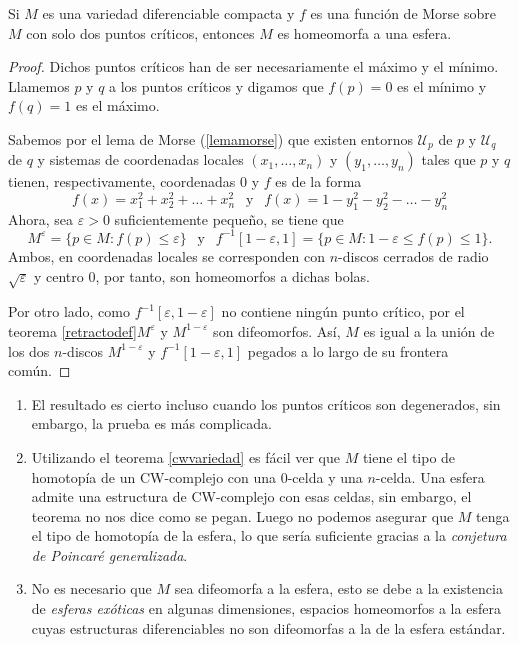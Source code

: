 \begin{theorem}
    Si $M$ es una variedad diferenciable compacta y $f$ es una función de Morse sobre $M$ con solo dos puntos críticos, entonces $M$ es homeomorfa a una esfera.
\end{theorem}
\begin{proof}
    Dichos puntos críticos han de ser necesariamente el máximo y el mínimo. Llamemos $p$ y $q$ a los puntos críticos y digamos que $f(p)=0$ es el mínimo y $f(q)=1$ es el máximo.

    Sabemos por el lema de Morse (\ref{lemamorse}) que existen entornos $\mathcal{U}_p$ de $p$ y $\mathcal{U}_q$ de $q$ y sistemas de coordenadas locales $(x_1,\dots,x_n)$ y $(y_1,\dots,y_n)$ tales que $p$ y $q$ tienen, respectivamente, coordenadas $0$ y $f$ es de la forma
    \begin{equation*}
        f(x) = x_1^2+x_2^2+\dots+x_n^2~~\text{ y }~~ f(x)=1-y_1^2- y_2^2-\dots-y_n^2
    \end{equation*}
    Ahora, sea $\varepsilon > 0$ suficientemente pequeño, se tiene que
    \begin{equation*}
        M^{\varepsilon} = \{p\in M \colon f(p)\le \varepsilon\} ~~\text{ y }~~ f^{-1}[1-\varepsilon,1] = \{p\in M \colon 1-\varepsilon \le f(p)\le 1\}.
    \end{equation*}
    Ambos, en coordenadas locales se corresponden con $n$-discos cerrados de radio $\sqrt{\varepsilon}$ y centro $0$, por tanto, son homeomorfos a dichas bolas.

    Por otro lado, como $f^{-1}[\varepsilon, 1-\varepsilon]$ no contiene ningún punto crítico, por el teorema \ref{retractodef}$M^{\varepsilon}$ y $M^{1-\varepsilon}$ son difeomorfos. Así, $M$ es igual a la unión de los dos $n$-discos $M^{1-\varepsilon}$ y $f^{-1}[1-\varepsilon,1]$ pegados a lo largo de su frontera común.

\end{proof}
\vspace{-1em}
\begin{remark}
    \hfil
    \begin{enumerate}[label=(\roman*)]
        \item El resultado es cierto incluso cuando los puntos críticos son degenerados, sin embargo, la prueba es más complicada.
        \item Utilizando el teorema \ref{cwvariedad} es fácil ver que $M$ tiene el tipo de homotopía de un CW-complejo con una $0$-celda y una $n$-celda. Una esfera admite una estructura de CW-complejo con esas celdas, sin embargo, el teorema no nos dice como se pegan. Luego no podemos asegurar que $M$ tenga el tipo de homotopía de la esfera, lo que sería suficiente gracias a la \textit{conjetura de Poincaré generalizada}.
        \item No es necesario que $M$ sea difeomorfa a la esfera, esto se debe a la existencia de \textit{esferas exóticas} en algunas dimensiones, espacios homeomorfos a la esfera cuyas estructuras diferenciables no son difeomorfas a la de la esfera estándar.
    \end{enumerate}
\end{remark}

